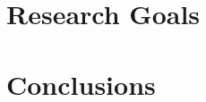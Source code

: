 \documentclass[12pt]{article}
\newcommand{\refdir}{../dissertation}
\begin{document}
\section{Research Goals\label{sec:goals}}


\section{Conclusions\label{sec:conclusions}}




\end{document}
